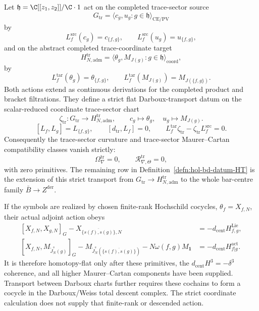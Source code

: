 \begin{prop}
\label{prop:trace-sector-darboux-flat-transport}
Let \(\mathfrak h=\C[[z_1,z_2]]/\C\cdot1\) act on the completed
trace-sector source
\[
  G_{\mathrm{tr}}
  =
  \langle c_g,u_g:g\in\mathfrak h\rangle_{\mathrm{CE/PV}}
\]
by
\[
  L^{\mathrm{src}}_f(c_g)=c_{\{f,g\}},
  \qquad
  L^{\mathrm{src}}_f(u_g)=u_{\{f,g\}},
\]
and on the abstract completed trace-coordinate target
\[
  H^{\mathrm{tr}}_{N,\mathrm{adm}}
  =
  \langle \theta_g,M_{J(g)}:g\in\mathfrak h\rangle_{\mathrm{coord}},
\]
by
\[
  L^{\mathrm{tar}}_f(\theta_g)=\theta_{\{f,g\}},
  \qquad
  L^{\mathrm{tar}}_f(M_{J(g)})=M_{J(\{f,g\})}.
\]
Both actions extend as continuous derivations for the completed
product and bracket filtrations.  They define a strict flat
Darboux-transport datum on the scalar-reduced coordinate trace-sector
chart
\[
  \zeta_{\mathrm{tr}}\colon
  G_{\mathrm{tr}}\longrightarrow H^{\mathrm{tr}}_{N,\mathrm{adm}},
  \qquad
  c_g\mapsto\theta_g,\quad u_g\mapsto M_{J(g)}.
\]
\[
  [L_f,L_g]=L_{\{f,g\}},\qquad
  [d_{\mathrm{tr}},L_f]=0,\qquad
  L^{\mathrm{tar}}_f\zeta_{\mathrm{tr}}
  -
  \zeta_{\mathrm{tr}}L^{\mathrm{src}}_f=0.
\]
Consequently the trace-sector curvature and trace-sector
Maurer--Cartan compatibility classes vanish strictly:
\[
  \Omega^{\mathrm{tr}}_{\nabla}=0,\qquad
  \mathcal R^{\mathrm{tr}}_{\nabla,\Theta}=0,
\]
with zero primitives.  The remaining row in
Definition~\ref{defn:hol-bd-datum-HT} is the extension of this strict
transport from \(G_{\mathrm{tr}}\to H^{\mathrm{tr}}_{N,\mathrm{adm}}\)
to the whole bar-centre family
\(\bar B\to Z^{\mathrm{der}}\).

If the symbols are realized by chosen finite-rank Hochschild cocycles,
\(\theta_f=X_{f,N}\), their actual adjoint action obeys
\[
  \begin{aligned}
    [X_{f,N},X_{g,N}]_G
      -X_{\overline{\{s(f),s(g)\}},N}
      &=-d_{\mathrm{cent}}H^{\mathrm{Lie}}_{f,g},\\
    [X_{f,N},M_{\widetilde J_N^s(g)}]_G
      -M_{\widetilde J_N^s(\overline{\{s(f),s(g)\}})}
      -N\omega(f,g)M_{\mathbf1}
      &=-d_{\mathrm{cent}}H^{\mathrm{act}}_{f|g}.
  \end{aligned}
\]
It is therefore homotopy-flat only after these primitives, the
\(d_{\mathrm{cent}}H^3=-\delta^3\) coherence, and all higher
Maurer--Cartan components have been supplied.  Transport between
Darboux charts further requires these cochains to form a cocycle in the
Darboux/Weiss total descent complex.  The strict coordinate calculation
does not supply that finite-rank or descended action.
\end{prop}

